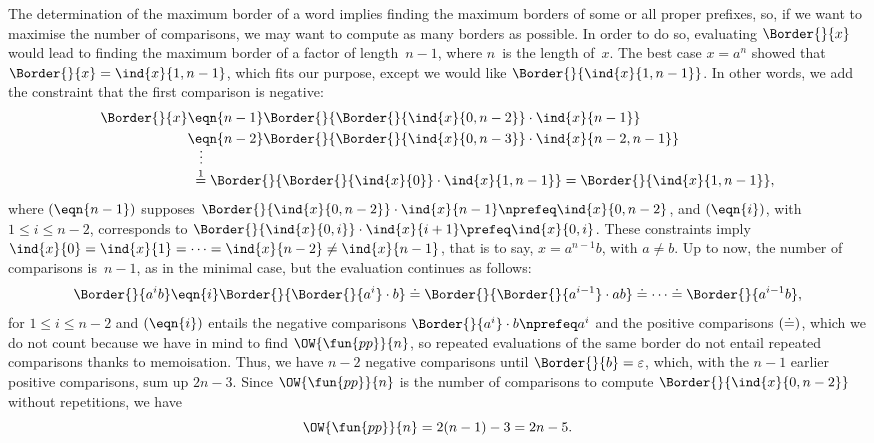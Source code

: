 The determination of the maximum border of a word implies finding the
maximum borders of some or all proper prefixes, so, if we want to
maximise the number of comparisons, we may want to compute as many
borders as possible. In order to do so, evaluating \(\Border{}{x}\)
would lead to finding the maximum border of a factor of
length~\(n-1\), where \(n\)~is the length of~\(x\). The best case
\(x=a^{n}\) showed that \(\Border{}{x} = \ind{x}{1,n-1}\), which fits
our purpose, except we would like \(\Border{}{\ind{x}{1,n-1}}\). In
other words, we add the constraint that the first comparison is
negative:
\begin{align*}
\Border{}{x}
&\eqn{n-1} \Border{}{\Border{}{\ind{x}{0,n-2}} \cdot \ind{x}{n-1}}\\
&\eqn{n-2} \Border{}{\Border{}{\ind{x}{0,n-3}} \cdot \ind{x}{n-2,n-1}}\\
&\;\;\;\smash{\vdots}\\
&\;\mathrel{\stackrel{\smash[t]{1}}{=}}
  \Border{}{\Border{}{\ind{x}{0}} \cdot \ind{x}{1,n-1}}
= \Border{}{\ind{x}{1,n-1}},
\end{align*}
where \((\smash{\eqn{n-1}})\) supposes \(\Border{}{\ind{x}{0,n-2}}
\cdot \ind{x}{n-1} \nprefeq \ind{x}{0,n-2}\), and
\((\smash{\eqn{i}})\), with \(1 \leqslant i \leqslant n-2\),
corresponds to \(\Border{}{\ind{x}{0,i}} \cdot \ind{x}{i+1} \prefeq
\ind{x}{0,i}\). These constraints imply \(\ind{x}{0} = \ind{x}{1} =
\dots = \ind{x}{n-2} \neq \ind{x}{n-1}\), that is to say,
\(x=a^{n-1}b\), with \(a \neq b\). Up to now, the number of
comparisons is~\(n-1\), as in the minimal case, but the evaluation
continues as follows:
\begin{equation*}
\Border{}{a^{i}b}
\eqn{i} \Border{}{\Border{}{a^{i}} \cdot b}\\
\doteq \Border{}{\Border{}{a^{i-1}} \cdot ab}\\
\doteq \dots \doteq \Border{}{a^{i-1}b},
\end{equation*}
for \(1 \leqslant i \leqslant n-2\) and \((\smash{\eqn{i}})\) entails
the negative comparisons \(\Border{}{a^{i}} \cdot b \nprefeq a^{i}\)
and the positive comparisons \((\smash{\doteq})\), which we do not
count because we have in mind to find
\(\OW{\fun{pp}}{n}\), so repeated
evaluations of the same border do not entail repeated comparisons
thanks to memoisation. Thus, we have \(n-2\)
negative comparisons until \(\Border{}{b} = \varepsilon\), which, with
the \(n-1\) earlier positive comparisons, sum up \(2n-3\). Since
\(\OW{\fun{pp}}{n}\) is the number of comparisons to compute
\(\Border{}{\ind{x}{0,n-2}}\) without repetitions, we have
\begin{equation*}
\belowdisplayskip=0pt
\OW{\fun{pp}}{n} = 2(n-1)-3 = 2n - 5.
\end{equation*}

